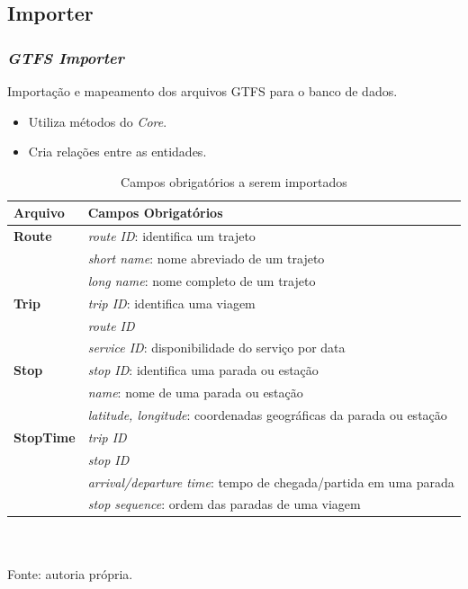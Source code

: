 \subsection{Importer}
\frame
{
\frametitle{\emph{GTFS Importer}}
Importação e mapeamento dos arquivos GTFS para o banco de dados.
\begin{itemize}
\item Utiliza métodos do \emph{Core}.
\item Cria relações entre as entidades.
\end{itemize}


\begin{table}
	\tiny
	\caption{Campos obrigatórios a serem importados}
	\begin{tabular}{ll}
		\hline
		\textbf{Arquivo} & \textbf{Campos Obrigatórios} \\
		\hline
		\textbf{Route} & \emph{route ID}: identifica um trajeto \\
				    & \emph{short name}: nome abreviado de um trajeto \\
				    & \emph{long name}: nome completo de um trajeto \\
		\textbf{Trip} & \emph{trip ID}: identifica uma viagem \\ 
				& \emph{route ID} \\ 
				& \emph{service ID}: disponibilidade do serviço por data \\
		\textbf{Stop} & \emph{stop ID}: identifica uma parada ou estação \\
				 & \emph{name}: nome de uma parada ou estação \\
				 & \emph{latitude, longitude}: coordenadas geográficas da parada ou estação \\
		\textbf{StopTime} & \emph{trip ID} \\
				         & \emph{stop ID} \\
				         & \emph{arrival/departure time}: tempo de chegada/partida em uma parada \\
				         & \emph{stop sequence}: ordem das paradas de uma viagem \\
		\hline
	\end{tabular}
	\\ ~ \\
	\tiny
	Fonte: autoria própria.
\end{table}
}

